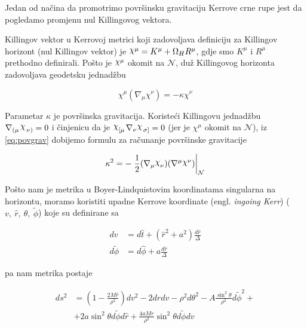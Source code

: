 Jedan od načina da promotrimo površinsku gravitaciju Kerrove crne rupe jest da pogledamo promjenu nul Killingovog vektora.

Killingov vektor u Kerrovoj metrici koji zadovoljava definiciju za Killingov horizont (nul Killingov vektor) je $\rchi^\mu=K^\mu+\Omega_H R^\mu$, gdje smo $K^\mu$ i $R^\mu$ prethodno definirali. Pošto je $\rchi^\mu$ okomit na $\mathcal{N}$, duž Killingovog horizonta zadovoljava geodetsku jednadžbu

\begin{equation}
\chi^\mu(\nabla_\mu\chi^\nu)=-\kappa\chi^\nu
\label{eq:povgrav}
\end{equation}

Parametar $\kappa$ je površinska gravitacija. Koristeći Killingovu jednadžbu $\nabla_{\left(\mu\right. }\rchi_{\left. \nu\right)}=0$ i činjenicu da je $\rchi_{\left[\mu\right.}\nabla_\nu \rchi_{\left.\sigma\right]}=0$ (jer je $\chi^\mu$ okomit na $\mathcal{N}$), iz \eqref{eq:povgrav} dobijemo formulu za računanje površinske gravitacije

\begin{equation}
\kappa^2=-\left.\frac{1}{2}(\nabla_\mu\rchi_\nu)(\nabla^\mu\rchi^\nu)\right\rvert_\mathcal{N}
\label{eq:povgravrac}
\end{equation}

\noindent Pošto nam je metrika u Boyer-Lindquistovim koordinatama singularna na horizontu, moramo koristiti upadne Kerrove koordinate (engl. \textit{ingoing Kerr}) ($v,\ \hat{r},\ \theta,\ \tilde{\phi}$) koje su definirane sa

\begin{equation*}
\begin{split}
dv&=d\hat{t}+(\hat{r}^2+a^2)\frac{d\hat{r}}{\Delta}\\
d\tilde{\phi}&=d\hat{\phi}+a\frac{d\hat{r}}{\Delta}
\end{split}
\end{equation*}

\noindent pa nam metrika postaje

\begin{equation*}
\begin{split}
ds^2&=\left(1-\frac{2M\hat{r}}{\rho^2}\right)dv^2-2d\hat{r}dv-\rho^2d\theta^2-A\frac{\sin^2\theta}{\rho^2}d\tilde{\phi}^2+\\
&+2a\sin^2\theta d\tilde{\phi}d\hat{r}+\frac{4aMr}{\rho^2}\sin^2\theta d\tilde{\phi} dv\\
\end{split}
\end{equation*}

